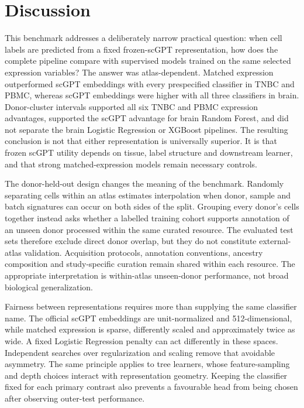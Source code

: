 \section{Discussion}

This benchmark addresses a deliberately narrow practical question: when cell labels are predicted from a fixed frozen-scGPT representation, how does the complete pipeline compare with supervised models trained on the same selected expression variables? The answer was atlas-dependent. Matched expression outperformed scGPT embeddings with every prespecified classifier in TNBC and PBMC, whereas scGPT embeddings were higher with all three classifiers in brain. Donor-cluster intervals supported all six TNBC and PBMC expression advantages, supported the scGPT advantage for brain Random Forest, and did not separate the brain Logistic Regression or XGBoost pipelines. The resulting conclusion is not that either representation is universally superior. It is that frozen scGPT utility depends on tissue, label structure and downstream learner, and that strong matched-expression models remain necessary controls.

The donor-held-out design changes the meaning of the benchmark. Randomly separating cells within an atlas estimates interpolation when donor, sample and batch signatures can occur on both sides of the split. Grouping every donor's cells together instead asks whether a labelled training cohort supports annotation of an unseen donor processed within the same curated resource. The evaluated test sets therefore exclude direct donor overlap, but they do not constitute external-atlas validation. Acquisition protocols, annotation conventions, ancestry composition and study-specific curation remain shared within each resource. The appropriate interpretation is within-atlas unseen-donor performance, not broad biological generalization.

Fairness between representations requires more than supplying the same classifier name. The official scGPT embeddings are unit-normalized and 512-dimensional, while matched expression is sparse, differently scaled and approximately twice as wide. A fixed Logistic Regression penalty can act differently in these spaces. Independent searches over regularization and scaling remove that avoidable asymmetry. The same principle applies to tree learners, whose feature-sampling and depth choices interact with representation geometry. Keeping the classifier fixed for each primary contrast also prevents a favourable head from being chosen after observing outer-test performance.

